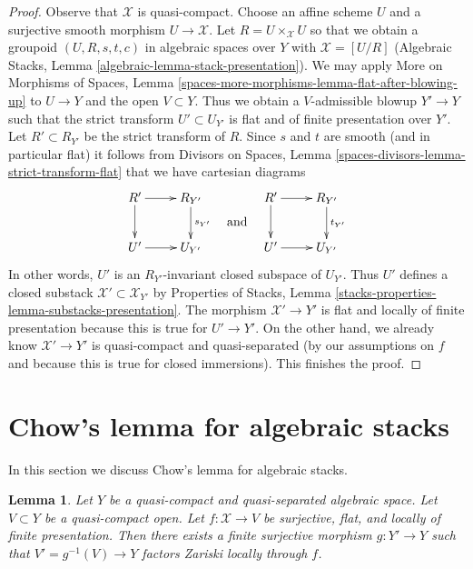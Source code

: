 \documentclass{stacks-project}
\theoremstyle{plain}
\newtheorem{lemma}[subsection]{Lemma}
\theoremstyle{definition}
\theoremstyle{remark}
\numberwithin{equation}{subsection}
\begin{document}
\begin{proof}
Observe that $\mathcal{X}$ is quasi-compact.
Choose an affine scheme $U$ and a surjective smooth
morphism $U \to \mathcal{X}$.
Let $R = U \times_\mathcal{X} U$ so that we obtain
a groupoid $(U, R, s, t, c)$ in algebraic spaces over $Y$ with
$\mathcal{X} = [U/R]$
(Algebraic Stacks, Lemma \ref{algebraic-lemma-stack-presentation}).
We may apply
More on Morphisms of Spaces, Lemma
\ref{spaces-more-morphisms-lemma-flat-after-blowing-up}
to $U \to Y$ and the open $V \subset Y$.
Thus we obtain a $V$-admissible blowup $Y' \to Y$
such that the strict transform $U' \subset U_{Y'}$
is flat and of finite presentation over $Y'$.
Let $R' \subset R_{Y'}$ be the strict transform of $R$.
Since $s$ and $t$ are smooth (and in particular flat)
it follows from
Divisors on Spaces, Lemma
\ref{spaces-divisors-lemma-strict-transform-flat}
that we have cartesian diagrams
$$
\vcenter{
\xymatrix{
R' \ar[r] \ar[d] & R_{Y'} \ar[d]^{s_{Y'}} \\
U' \ar[r] & U_{Y'}
}
}
\quad\text{and}\quad
\vcenter{
\xymatrix{
R' \ar[r] \ar[d] & R_{Y'} \ar[d]^{t_{Y'}} \\
U' \ar[r] & U_{Y'}
}
}
$$
In other words, $U'$ is an $R_{Y'}$-invariant closed subspace
of $U_{Y'}$. Thus $U'$ defines a closed substack
$\mathcal{X}' \subset \mathcal{X}_{Y'}$ by
Properties of Stacks, Lemma
\ref{stacks-properties-lemma-substacks-presentation}.
The morphism $\mathcal{X}' \to Y'$ is flat and
locally of finite presentation because this is
true for $U' \to Y'$. On the other hand,
we already know $\mathcal{X}' \to Y'$ is quasi-compact and quasi-separated
(by our assumptions on $f$ and because this is true for closed immersions).
This finishes the proof.
\end{proof}















\section{Chow's lemma for algebraic stacks}
\label{section-chow}

\noindent
In this section we discuss Chow's lemma for algebraic stacks.

\begin{lemma}
\label{lemma-finite-cover-factor}
Let $Y$ be a quasi-compact and quasi-separated algebraic space.
Let $V \subset Y$ be a quasi-compact open. Let $f : \mathcal{X} \to V$
be surjective, flat, and locally of finite presentation.
Then there exists a finite surjective morphism $g : Y' \to Y$ such that
$V' = g^{-1}(V) \to Y$ factors Zariski locally through $f$.
\end{lemma}
\end{document}

